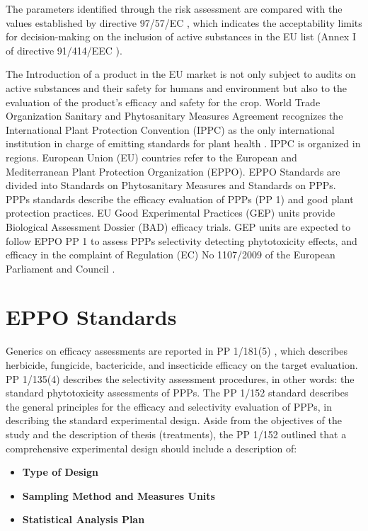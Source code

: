 \documentclass[12pt,a4paper,oneside]{report}
\begin{document}
The parameters identified through the risk assessment are compared with the values 
established by directive 97/57/EC \cite{EURLex1997265}, which indicates the acceptability limits for 
decision-making on the inclusion of active substances in the EU list (Annex I of 
directive 91/414/EEC \cite{directive_91_414_EEC}).

The Introduction of a product in the EU market is not only subject to audits on
active substances and their safety for humans and environment but also to the evaluation 
of the product's efficacy and safety for the crop.
World Trade Organization Sanitary and Phytosanitary Measures Agreement \cite{WTO_SPS_Agreement}
recognizes the International Plant Protection Convention (IPPC) as the only international
institution in charge of emitting standards for plant health \cite{IPPC}. IPPC is organized in
regions. European Union (EU) countries refer to the European and Mediterranean Plant
Protection Organization (EPPO). EPPO Standards are divided into Standards on
Phytosanitary Measures and Standards on PPPs. PPPs standards describe the efficacy
evaluation of PPPs (PP 1) and good plant protection practices. EU Good Experimental
Practices (GEP) units provide
Biological Assessment Dossier (BAD) efficacy trials. GEP units are expected to follow
EPPO PP 1 to assess PPPs selectivity detecting phytotoxicity effects, and efficacy in the
complaint of Regulation (EC) No 1107/2009 of the European Parliament and Council \cite{EC_Regulation_1107_2009}.

\section{EPPO Standards}

Generics on efficacy assessments are reported in PP 1/181(5) \cite{EPPO_PP1_181}, which describes
herbicide, fungicide, bactericide, and insecticide efficacy on the target evaluation.
PP 1/135(4) \cite{EPPO_PP1_135} describes the selectivity assessment procedures, 
in other words: the standard phytotoxicity assessments of PPPs.
The PP 1/152 \cite{EPPO_PP1_152} standard describes the general principles for the
efficacy and selectivity evaluation of PPPs, in describing the standard experimental design.
Aside from the objectives of the study and the description of thesis (treatments), 
the PP 1/152 outlined that a comprehensive experimental design should include a description of:
\begin{itemize}
    \item \textbf{Type of Design}
    \item \textbf{Sampling Method and Measures Units}
    \item \textbf{Statistical Analysis Plan}
\end{itemize}
\end{document}
